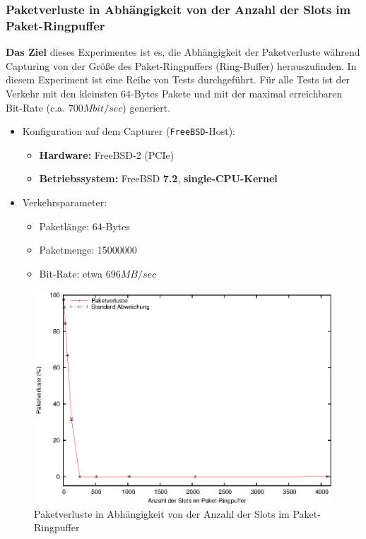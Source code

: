 \subsubsection*{Paketverluste in Abhängigkeit von der Anzahl der Slots im  Paket-Ringpuffer}
\textbf{Das Ziel} dieses Experimentes ist es, die Abhängigkeit der Paketverluste
während Capturing von der Größe des Paket-Ringpuffers (Ring-Buffer)
herauszufinden. In diesem Experiment ist eine Reihe von Tests durchgeführt. Für
alle Tests ist der Verkehr mit den kleinsten 64-Bytes Pakete und mit der maximal
erreichbaren Bit-Rate (c.a. $700Mbit/sec$) generiert.
%
\begin{itemize}
\item Konfiguration auf dem Capturer (\verb+FreeBSD+-Host): 
\begin{itemize}
	\item \textbf{Hardware:} FreeBSD-2 (PCIe)
	\item \textbf{Betriebssystem:} FreeBSD \textbf{7.2}, \textbf{single-CPU-Kernel}
\end{itemize}
\item Verkehrsparameter:
\begin{itemize}
	\item Paketlänge: 64-Bytes
	\item Paketmenge: 15000000
	\item Bit-Rate: etwa $696MB/sec$
\end{itemize}
\end{itemize}
\begin{figure} 
\centering \includegraphics[width=5.5in]{plots/graphs/pktlos_single_bufsize.eps}
\caption{Paketverluste in Abhängigkeit von der Anzahl der Slots im Paket-Ringpuffer}
\label{img:plot_pktlos_puffs}
\end{figure}
%
% 
